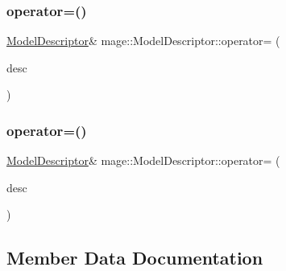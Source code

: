 \hypertarget{classmage_1_1_model_descriptor_a734b17224719896921e9f6252ee88483}{}\label{classmage_1_1_model_descriptor_a734b17224719896921e9f6252ee88483} 
\subsubsection{\texorpdfstring{operator=()}{operator=()}\hspace{0.1cm}{\footnotesize\ttfamily [1/2]}}
{\footnotesize\ttfamily \hyperlink{classmage_1_1_model_descriptor}{Model\+Descriptor}\& mage\+::\+Model\+Descriptor\+::operator= (\begin{DoxyParamCaption}\item[{const \hyperlink{classmage_1_1_model_descriptor}{Model\+Descriptor} \&}]{desc }\end{DoxyParamCaption})\hspace{0.3cm}{\ttfamily [delete]}}

\hypertarget{classmage_1_1_model_descriptor_ae2ae685569c0ae534d9f0b5622a807d0}{}\label{classmage_1_1_model_descriptor_ae2ae685569c0ae534d9f0b5622a807d0} 
\subsubsection{\texorpdfstring{operator=()}{operator=()}\hspace{0.1cm}{\footnotesize\ttfamily [2/2]}}
{\footnotesize\ttfamily \hyperlink{classmage_1_1_model_descriptor}{Model\+Descriptor}\& mage\+::\+Model\+Descriptor\+::operator= (\begin{DoxyParamCaption}\item[{\hyperlink{classmage_1_1_model_descriptor}{Model\+Descriptor} \&\&}]{desc }\end{DoxyParamCaption})\hspace{0.3cm}{\ttfamily [delete]}}



\subsection{Member Data Documentation}
\hypertarget{classmage_1_1_model_descriptor_a672238b257f99836243d84f634ffeea2}{}\label{classmage_1_1_model_descriptor_a672238b257f99836243d84f634ffeea2} 
